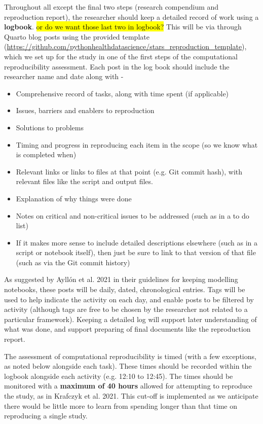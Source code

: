 Throughout all except the final two steps (research compendium and reproduction report), the researcher should keep a detailed record of work using a \textbf{logbook}. \hl{or do we want those last two in logbook?} This will be via through Quarto blog posts using the provided template (\url{https://github.com/pythonhealthdatascience/stars_reproduction_template}), which we set up for the study in one of the first steps of the computational reproducibility assessment. Each post in the log book should include the researcher name and date along with -
\begin{itemize}
    \item Comprehensive record of tasks, along with time spent (if applicable)
    \item Issues, barriers and enablers to reproduction
    \item Solutions to problems
    \item Timing and progress in reproducing each item in the scope (so we know what is completed when)
    \item Relevant links or links to files at that point (e.g. Git commit hash), with relevant files like the script and output files.
    \item Explanation of why things were done
    \item Notes on critical and non-critical issues to be addressed (such as in a to do list)
    \item If it makes more sense to include detailed descriptions elsewhere (such as in a script or notebook itself), then just be sure to link to that version of that file (such as via the Git commit history)
\end{itemize}

As suggested by Ayllón et al. 2021\autocite{ayllon_keeping_2021} in their guidelines for keeping modelling notebooks, these posts will be daily, dated, chronological entries. Tags will be used to help indicate the activity on each day, and enable posts to be filtered by activity (although tags are free to be chosen by the researcher not related to a particular framework). Keeping a detailed log will support later understanding of what was done, and support preparing of final documents like the reproduction report.

The assessment of computational reproducibility is timed (with a few exceptions, as noted below alongside each task). These times should be recorded within the logbook alongside each activity (e.g. 12:10 to 12:45). The times should be monitored with a \textbf{maximum of 40 hours} allowed for attempting to reproduce the study, as in Krafczyk et al. 2021.\autocite{krafczyk_learning_2021} This cut-off is implemented as we anticipate there would be little more to learn from spending longer than that time on reproducing a single study.